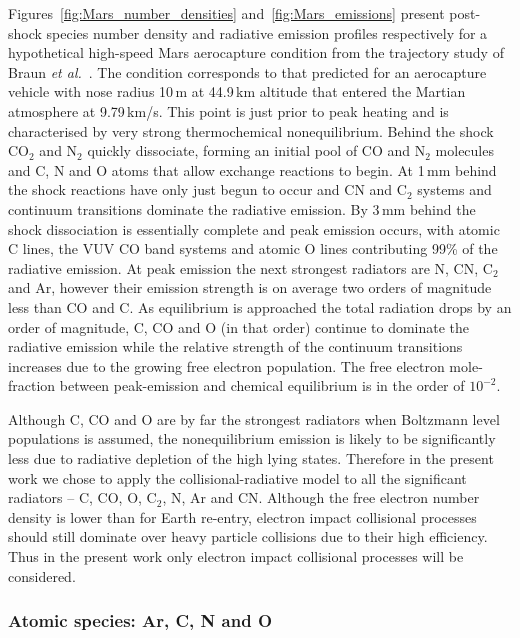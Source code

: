 {Figures~\ref{fig:Mars_number_densities} and~\ref{fig:Mars_emissions} present post-shock species number density and radiative emission profiles respectively for a hypothetical high-speed Mars aerocapture condition from the trajectory study of Braun \textit{et al.}~\cite{BPH90}.
The condition corresponds to that predicted for an aerocapture vehicle with nose radius 10\,m at 44.9\,km altitude that entered the Martian atmosphere at 9.79\,km/s.
This point is just prior to peak heating and is characterised by very strong thermochemical nonequilibrium.
Behind the shock CO$_2$ and N$_2$ quickly dissociate, forming an initial pool of CO and N$_2$ molecules and C, N and O atoms that allow exchange reactions to begin.
At 1\,mm behind the shock reactions have only just begun to occur and CN and C$_2$ systems and continuum transitions dominate the radiative emission.
By 3\,mm behind the shock dissociation is essentially complete and peak emission occurs, with atomic C lines, the VUV CO band systems and atomic O lines contributing 99\% of the radiative emission.
At peak emission the next strongest radiators are N, CN, C$_2$ and Ar, however their emission strength is on average two orders of magnitude less than CO and C.
As equilibrium is approached the total radiation drops by an order of magnitude, C, CO and O (in that order) continue to dominate the radiative emission while the relative strength of the continuum transitions increases due to the growing free electron population.
The free electron mole-fraction between peak-emission and chemical equilibrium is in the order of $10^{-2}$.

\par

Although C, CO and O are by far the strongest radiators when Boltzmann level populations is assumed, the nonequilibrium emission is likely to be significantly less due to radiative depletion of the high lying states.  
Therefore in the present work we chose to apply the collisional-radiative model to all the significant radiators -- C, CO, O, C$_2$, N, Ar and CN.
Although the free electron number density is lower than for Earth re-entry, electron impact collisional processes should still dominate over heavy particle collisions due to their high efficiency.
Thus in the present work only electron impact collisional processes will be considered.

\subsubsection{Atomic species: Ar, C, N and O}

}
